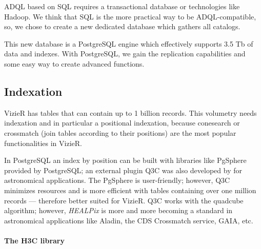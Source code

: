 ADQL based on SQL requires a transactional database or technologies like Hadoop. We think that SQL is the more practical way to be ADQL-compatible, so, we chose to create a new dedicated database which gathers all catalogs. 

This new database is a PostgreSQL engine which effectively supports 3.5 Tb of data and indexes. With PostgreSQL, we gain the replication capabilities and some easy way to create advanced functions.

\subsection{Indexation}
VizieR has tables that can contain up to 1 billion records. This volumetry needs indexation and in particular a positional indexation, because conesearch or crossmatch (join tables according to their positions) are the most popular functionalities in VizieR.

In PostgreSQL an index by position can be built with libraries like PgSphere provided by PostgreSQL; an external plugin Q3C was also developed by \citet{q3c_2006} for astronomical applications. The PgSphere is user-friendly; however, Q3C minimizes resources and is more efficient with tables containing over one million records --- therefore better suited for VizieR. Q3C works with the quadcube algorithm; however, {\em {}HEALPix} is more and more becoming a standard in astronomical applications like Aladin, the CDS Crossmatch service, GAIA, etc.


\paragraph{The H3C library}

